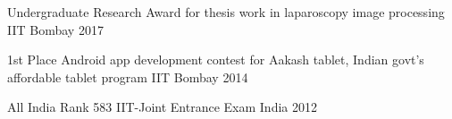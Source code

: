 



\begin{cvhonors}

  \cvhonor
    {Undergraduate Research Award} %
    {for thesis work in laparoscopy image processing} %
    {IIT Bombay} %
    {2017} %

  \cvhonor
    {1st Place} %
    {Android app development contest for Aakash tablet, Indian govt’s affordable tablet program} %
    {IIT Bombay} %
    {2014} %

  \cvhonor
    {All India Rank 583} %
    {IIT-Joint Entrance Exam} %
    {India} %
    {2012} %

\end{cvhonors}

